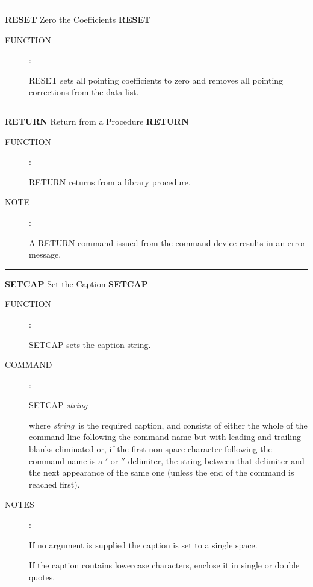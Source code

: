 
\goodbreak
\rule{\textwidth}{0.3mm}
{\Large {\bf RESET} \hfill Zero the Coefficients \hfill {\bf RESET}}
\begin{description}
\item [FUNCTION]:

RESET sets all pointing coefficients to zero and
removes all pointing corrections from the data list.

\end{description}


\goodbreak
\rule{\textwidth}{0.3mm}
{\Large {\bf RETURN} \hfill Return from a Procedure \hfill {\bf RETURN}}
\begin{description}
\item [FUNCTION]:

RETURN returns from a library procedure.

\item [NOTE]:

A RETURN command issued from the command device results in an
error message.

\end{description}


\goodbreak
\rule{\textwidth}{0.3mm}
{\Large {\bf SETCAP} \hfill Set the Caption \hfill {\bf SETCAP}}
\begin{description}
\item [FUNCTION]:

SETCAP sets the caption string.

\item [COMMAND]:

\begin{cmd}
\> \> SETCAP {\it string}
\end{cmd}

where {\it string}\, is the required caption, and consists of
either the whole of the command line following the command
name but with leading and trailing blanks eliminated or,
if the first non-space character following the command name
is a $'$ or $''$ delimiter, the string between that delimiter and
the next appearance of the same one (unless the end of the
command is reached first).

\item [NOTES]:

If no argument is supplied the caption is set to a single space.

If the caption contains lowercase characters, enclose it in
single or double quotes.

\end{description}

